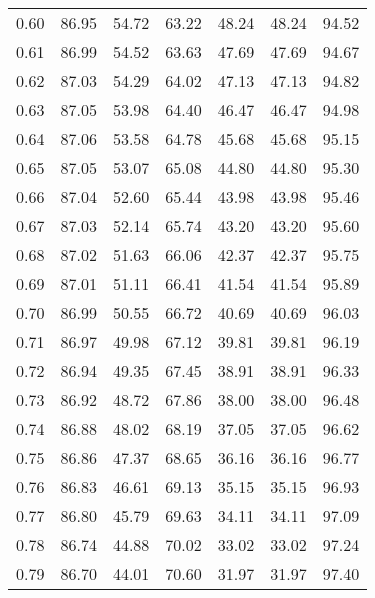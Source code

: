 \begin{tabular}{|c|c|c|c|c|c|c|}
      0.60 &     86.95 &     54.72 &      63.22 &   48.24 &      48.24 &         94.52 \\
      0.61 &     86.99 &     54.52 &      63.63 &   47.69 &      47.69 &         94.67 \\
      0.62 &     87.03 &     54.29 &      64.02 &   47.13 &      47.13 &         94.82 \\
      0.63 &     87.05 &     53.98 &      64.40 &   46.47 &      46.47 &         94.98 \\
      0.64 &     87.06 &     53.58 &      64.78 &   45.68 &      45.68 &         95.15 \\
      0.65 &     87.05 &     53.07 &      65.08 &   44.80 &      44.80 &         95.30 \\
      0.66 &     87.04 &     52.60 &      65.44 &   43.98 &      43.98 &         95.46 \\
      0.67 &     87.03 &     52.14 &      65.74 &   43.20 &      43.20 &         95.60 \\
      0.68 &     87.02 &     51.63 &      66.06 &   42.37 &      42.37 &         95.75 \\
      0.69 &     87.01 &     51.11 &      66.41 &   41.54 &      41.54 &         95.89 \\
      0.70 &     86.99 &     50.55 &      66.72 &   40.69 &      40.69 &         96.03 \\
      0.71 &     86.97 &     49.98 &      67.12 &   39.81 &      39.81 &         96.19 \\
      0.72 &     86.94 &     49.35 &      67.45 &   38.91 &      38.91 &         96.33 \\
      0.73 &     86.92 &     48.72 &      67.86 &   38.00 &      38.00 &         96.48 \\
      0.74 &     86.88 &     48.02 &      68.19 &   37.05 &      37.05 &         96.62 \\
      0.75 &     86.86 &     47.37 &      68.65 &   36.16 &      36.16 &         96.77 \\
      0.76 &     86.83 &     46.61 &      69.13 &   35.15 &      35.15 &         96.93 \\
      0.77 &     86.80 &     45.79 &      69.63 &   34.11 &      34.11 &         97.09 \\
      0.78 &     86.74 &     44.88 &      70.02 &   33.02 &      33.02 &         97.24 \\
      0.79 &     86.70 &     44.01 &      70.60 &   31.97 &      31.97 &         97.40 \\

\end{tabular}
